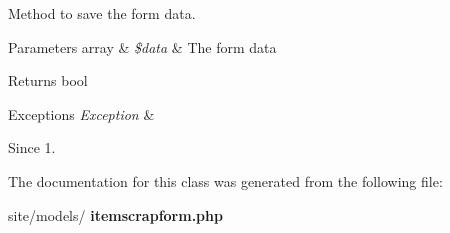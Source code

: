 Method to save the form data.


\begin{DoxyParams}[1]{Parameters}
array & {\em \$data} & The form data\\
\hline
\end{DoxyParams}
\begin{DoxyReturn}{Returns}
bool
\end{DoxyReturn}

\begin{DoxyExceptions}{Exceptions}
{\em Exception} & \\
\hline
\end{DoxyExceptions}
\begin{DoxySince}{Since}
1. 
\end{DoxySince}


The documentation for this class was generated from the following file\+:\begin{DoxyCompactItemize}
\item 
site/models/\textbf{ itemscrapform.\+php}\end{DoxyCompactItemize}

